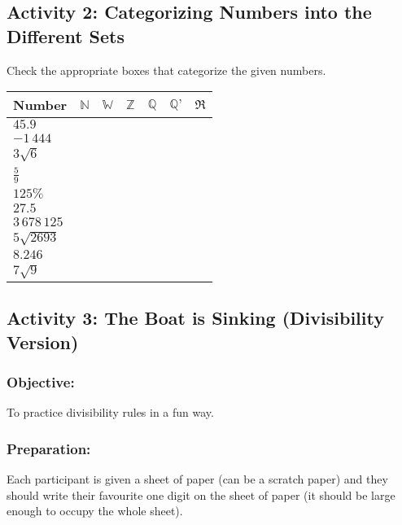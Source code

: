 \subsection*{Activity 2: Categorizing Numbers into the Different Sets}
Check the appropriate boxes that categorize the given numbers.
{\renewcommand{\arraystretch}{1.5}
\begin{center}
\begin{tabular}{|l|c|c|c|c|c|c|}
\hline 
Number & $\mathbb N$ & $\mathbb W$ & $\mathbb Z$ & $\mathbb Q$ & $\mathbb{Q’}$ & $\Re$ \\ \hline \hline
$45.9$ & \hphantom{check} & \hphantom{check} & \hphantom{check} & \hphantom{check} & \hphantom{check} & \hphantom{check} \\ \hline
$-1\,444$  & & & & & & \\ \hline
$3\sqrt{6}$  & & & & & & \\ \hline
$\frac{5}{9}$  & & & & & & \\ \hline
$125\%$  & & & & & & \\ \hline
$27.5$  & & & & & & \\ \hline
$3\, 678\, 125$  & & & & & & \\ \hline
$5\sqrt{2693}$  & & & & & & \\ \hline
$8.246$  & & & & & & \\ \hline
$7\sqrt{9}$  & & & & & & \\ \hline
\end{tabular}
\end{center}
}

\subsection*{Activity 3: The Boat is Sinking (Divisibility Version)}
\subsubsection*{Objective:}
To practice divisibility rules in a fun way.
\subsubsection*{Preparation:}
Each participant is given a sheet of paper (can be a scratch paper) and they should write
their favourite one digit on the sheet of paper (it should be large enough to occupy the
whole sheet).
